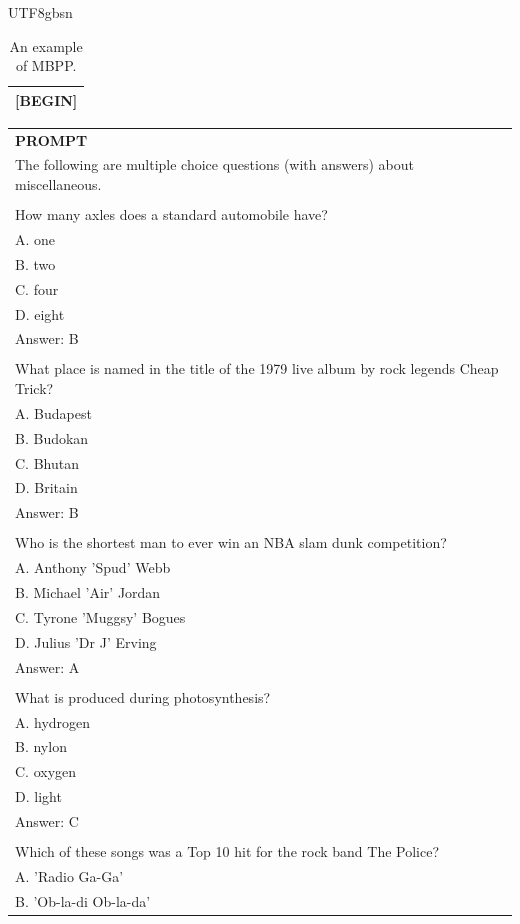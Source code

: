 \documentclass[11pt, a4paper, logo, copyright, nonumbering]{deepseek}
\begin{document}
\begin{CJK*}{UTF8}{gbsn}
\begin{table}[h]
\begin{tabular}{p{12cm}}
[BEGIN]\\
\bottomrule
\end{tabular}
    \caption{\centering An example of MBPP.}
    \label{tab:mbpp_eval_format_example}
\end{table}

\begin{table}[h]
    \centering \small
\begin{tabular}{p{12cm}}
\toprule
\textbf{PROMPT}\\

The following are multiple choice questions (with answers) about miscellaneous.\\
\\
How many axles does a standard automobile have?\\
A. one\\
B. two\\
C. four\\
D. eight\\
Answer: B\\
\\
What place is named in the title of the 1979 live album by rock legends Cheap Trick?\\
A. Budapest\\
B. Budokan\\
C. Bhutan\\
D. Britain\\
Answer: B\\
\\
Who is the shortest man to ever win an NBA slam dunk competition?\\
A. Anthony 'Spud' Webb\\
B. Michael 'Air' Jordan\\
C. Tyrone 'Muggsy' Bogues\\
D. Julius 'Dr J' Erving\\
Answer: A\\
\\
What is produced during photosynthesis?\\
A. hydrogen\\
B. nylon\\
C. oxygen\\
D. light\\
Answer: C\\
\\
Which of these songs was a Top 10 hit for the rock band The Police?\\
A. 'Radio Ga-Ga'\\
B. 'Ob-la-di Ob-la-da'\\

\end{tabular}
\end{table}
\end{CJK*}
\end{document}

